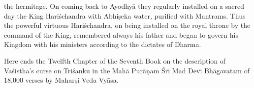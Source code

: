 the hermitage. On coming back to Ayodhy\=a they regularly installed on a sacred day the King Hari\'schandra with Abhi\d{s}eka water, purified with Mantrams. Thus the powerful virtuous Hari\'schandra, on being installed on the royal throne by the command of the King, remembered always his father and began to govern his Kingdom with his ministers according to the dictates of Dharma.

Here ends the Twelfth Chapter of the Seventh Book on the description of Va\'sistha's curse on Tri\'sanku in the Mah\=a Pur\=a\d{n}am \'Sr\={\i} Mad Dev\={\i} Bh\=agavatam of 18,000 verses by Mahar\d{s}i Veda Vy\=asa.



